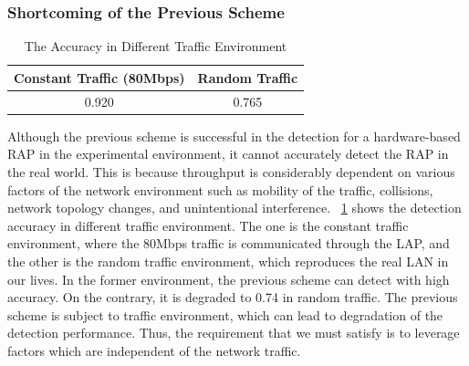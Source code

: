 \documentclass[conference]{IEEEtran}
\begin{document}
\subsubsection{Shortcoming of the Previous Scheme}\label{sec:shortcoming}
\begin{table}[t] 
    \begin{center}
        \caption{The Accuracy in Different Traffic Environment}
        \label{tab:thrput result}
        \begin{tabular}{c c} \hline
            Constant Traffic (80Mbps) & Random Traffic \\ \hline \hline
            0.920 & 0.765 \\ \hline
        \end{tabular}
    \end{center}
    \vspace{-2zh}
\end{table}
Although the previous scheme is successful in the detection for a hardware-based RAP in the experimental environment, it cannot accurately detect the RAP in the real world.
This is because throughput is considerably dependent on various factors of the network environment such as mobility of the traffic, collisions, network topology changes, and unintentional interference.
\tablename~\ref{tab:thrput result} shows the detection accuracy in different traffic environment.
The one is the constant traffic environment, where the 80Mbps traffic is communicated through the LAP, and the other is the random traffic environment, which reproduces the real LAN in our lives.
In the former environment, the previous scheme can detect with high accuracy.
On the contrary, it is degraded to 0.74 in random traffic.
The previous scheme is subject to traffic environment, which can lead to degradation of the detection performance.
Thus, the requirement that we must satisfy is to leverage factors which are independent of the network traffic.
\end{document}
